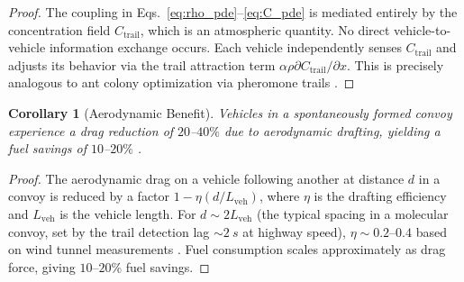\documentclass[11pt,twocolumn,a4paper]{article}
\theoremstyle{plain}
\newtheorem{corollary}[theorem]{Corollary}
\theoremstyle{definition}
\theoremstyle{remark}
\newcommand{\Ctrail}{C_{\mathrm{trail}}}
\begin{document}
\begin{proof}
The coupling in Eqs.~\eqref{eq:rho_pde}--\eqref{eq:C_pde} is mediated entirely by the concentration field $\Ctrail$, which is an atmospheric quantity. No direct vehicle-to-vehicle information exchange occurs. Each vehicle independently senses $\Ctrail$ and adjusts its behavior via the trail attraction term $\alpha\rho\partial\Ctrail/\partial x$. This is precisely analogous to ant colony optimization via pheromone trails \cite{helbing2001traffic}.
\end{proof}

\begin{corollary}[Aerodynamic Benefit]
\label{cor:aerodynamic}
Vehicles in a spontaneously formed convoy experience a drag reduction of $20$--$40\%$ due to aerodynamic drafting, yielding a fuel savings of $10$--$20\%$ \cite{alam2015heavy, tsugawa2016review, bergenhem2012overview}.
\end{corollary}

\begin{proof}
The aerodynamic drag on a vehicle following another at distance $d$ in a convoy is reduced by a factor $1 - \eta(d/L_{\mathrm{veh}})$, where $\eta$ is the drafting efficiency and $L_{\mathrm{veh}}$ is the vehicle length. For $d \sim 2 L_{\mathrm{veh}}$ (the typical spacing in a molecular convoy, set by the trail detection lag $\sim \SI{2}{s}$ at highway speed), $\eta \sim 0.2$--$0.4$ based on wind tunnel measurements \cite{alam2015heavy}. Fuel consumption scales approximately as drag force, giving $10$--$20\%$ fuel savings.
\end{proof}
\end{document}
